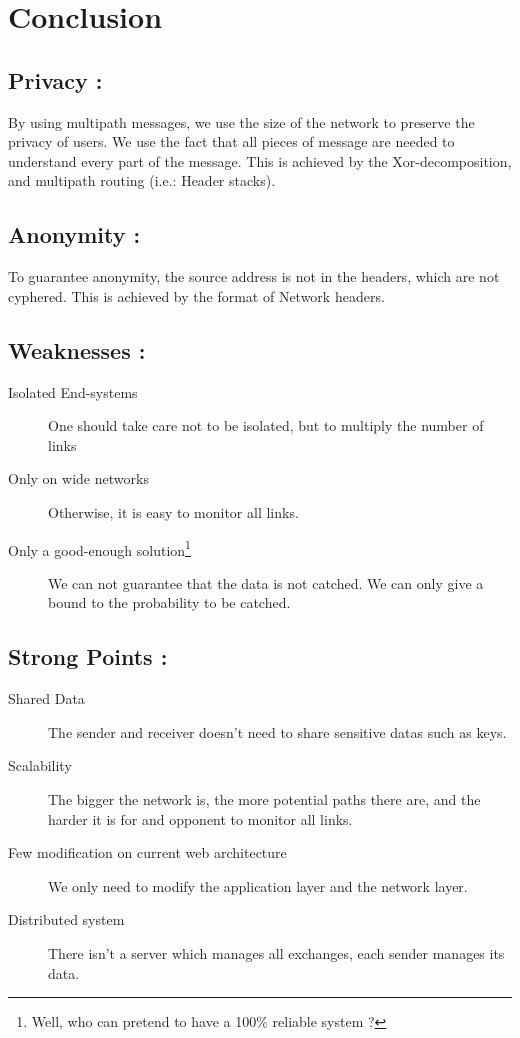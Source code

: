 \documentclass[a4paper, onecolumn, 10pt]{article}
\numberwithin{equation}{section}
\begin{document}
\section{Conclusion}
\subsection{Privacy :}
By using multipath messages, we use the size of the network to preserve the privacy of users. We use the fact that all pieces of message are needed to understand every part of the message. This is achieved by the Xor-decomposition, and multipath routing (i.e.: Header stacks).
\subsection{Anonymity :}
To guarantee anonymity, the source address is not in the headers, which are not cyphered. This is achieved by the format of Network headers.
\subsection{Weaknesses :}
\begin{description}
  \item[Isolated End-systems] One should take care not to be isolated, but to multiply the number of links
  \item[Only on wide networks] Otherwise, it is easy to monitor all links.
  \item[Only a good-enough solution\protect\footnote{Well, who can pretend to have a 100\% reliable system ?}] We can not guarantee that the data is not catched. We can only give a bound to the probability to be catched.
\end{description}
\subsection{Strong Points :}
\begin{description}
  \item[Shared Data] The sender and receiver doesn't need to share sensitive datas such as keys. 
  \item[Scalability] The bigger the network is, the more potential paths there are, and the harder it is for and opponent to monitor all links.
  \item[Few modification on current web architecture] We only need to modify the application layer and the network layer.
  \item[Distributed system] There isn't a server which manages all exchanges, each sender manages its data.
\end{description}
\end{document}
